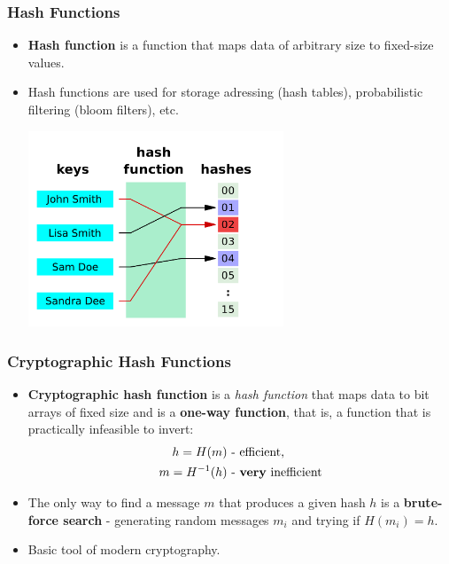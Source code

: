 \documentclass{beamer}
\begin{document}
\begin{frame}
  \frametitle{Hash Functions}
  \begin{itemize}
  \item \textbf{Hash function} is a function that maps data of arbitrary size to
    fixed-size values.
  \item Hash functions are used for storage adressing (hash tables),
    probabilistic filtering (bloom filters), etc.
    \begin{center}
      \includegraphics[width=0.6\textwidth,]{hash_function}
    \end{center}
  \end{itemize}
\end{frame}

\begin{frame}
  \frametitle{Cryptographic Hash Functions}
  \begin{itemize}    
  \item \textbf{Cryptographic hash function} is a \textit{hash function} that
    maps data to bit arrays of fixed size and is a \textbf{one-way function},
    that is, a function that is practically infeasible to invert:
    \begin{align*}
      h = H(m)&\text{ - efficient,}\\
      m = H^{-1}(h)&\text{ - \textbf{very} inefficient}
    \end{align*}
  \item The only way to find a message $m$ that produces a given hash $h$ is a
    \textbf{brute-force search} - generating random messages $m_i$ and trying if
    $H(m_i) = h$.
  \item Basic tool of modern cryptography.
  \end{itemize}
\end{frame}
\end{document}
